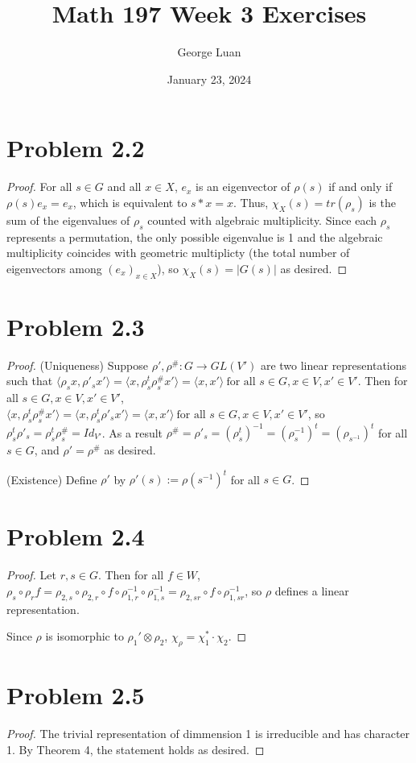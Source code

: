 \documentclass{article}
\title{Math 197 Week 3 Exercises}
\author{George Luan}
\date{January 23, 2024} %
\begin{document}
\maketitle

\section*{Problem 2.2}
\begin{proof}
    For all $s\in G$ and all $x \in X$, $e_{x}$ is an eigenvector of $\rho(s)$ if and only if $\rho(s)e_{x} = e_{x}$, which is equivalent to $s*x = x$. Thus, $\chi_{X}(s) = tr(\rho_s)$ is the sum of the eigenvalues of $\rho_{s}$ counted with algebraic multiplicity. Since each $\rho_s$ represents a permutation, the only possible eigenvalue is 1 and the algebraic multiplicity coincides with geometric multiplicty (the total number of eigenvectors among $(e_{x})_{x \in X}$), so $\chi_{X}(s) = |G(s)|$ as desired.  
\end{proof}

\section*{Problem 2.3}
\begin{proof}
(Uniqueness) Suppose $\rho', \rho^\#: G \to GL(V')$ are two linear representations such that $\langle \rho_s x, \rho'_s x'\rangle = \langle x, \rho_s^{t}\rho^\#_s x'\rangle = \langle x, x' \rangle \ \text{for all } s \in G, x \in V, x' \in V'$.
Then for all $s \in G, x \in V, x' \in V'$, $\langle x, \rho_s^{t}\rho^{\#}_s x'\rangle = \langle x, \rho_s^{t}\rho'_s x'\rangle = \langle x, x' \rangle \ \text{for all } s \in G, x \in V, x' \in V'$, so $\rho_s^{t}\rho'_s = \rho_s^{t}\rho^\#_s = Id_{V'}$. As a result $\rho^\# = \rho'_s = (\rho_s^{t})^{-1} = (\rho_s^{-1})^{t} = (\rho_{s^{-1}})^{t}$ for all $s \in G$, and $\rho' = \rho^\#$ as desired.

(Existence) Define $\rho'$ by $\rho'(s) := \rho(s^{-1})^t$ for all $s \in G$.
\end{proof}


\section*{Problem 2.4}
\begin{proof}
    Let $r, s \in G$. Then for all $f \in W$, $\rho_s\circ\rho_r f = \rho_{2, s} \circ \rho_{2, r} \circ f \circ \rho_{1, r}^{-1} \circ \rho_{1, s}^{-1} = \rho_{2, sr} \circ f \circ \rho_{1, sr}^{-1}$, so $\rho$ defines a linear representation.

    Since $\rho$ is isomorphic to $\rho_1' \otimes \rho_2$, $\chi_\rho = \chi_{1}^* \cdot \chi_2$.
\end{proof}

\section*{Problem 2.5}
\begin{proof}
    The trivial representation of dimmension 1 is irreducible and has character 1. By Theorem 4, the statement holds as desired.
\end{proof}
\end{document}
